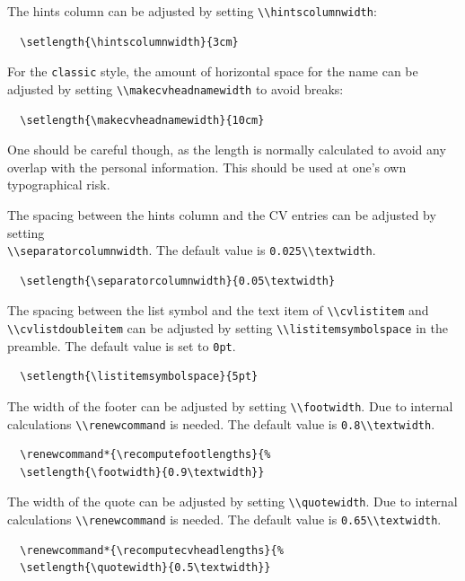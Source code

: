\documentclass[a4paper, 11pt]{article}
\newcommand{\code}[1]{\lstinline!#1!}
\begin{document}
The hints column can be adjusted by setting \code{\\hintscolumnwidth}:
\begin{lstlisting}
  \setlength{\hintscolumnwidth}{3cm}
\end{lstlisting}

For the \code{classic} style, the amount of horizontal space for the name can be adjusted by setting \code{\\makecvheadnamewidth} to avoid breaks:
\begin{lstlisting}
  \setlength{\makecvheadnamewidth}{10cm}
\end{lstlisting}
One should be careful though, as the length is normally calculated to avoid any overlap with the personal information.
This should be used at one's own typographical risk.

The spacing between the hints column and the CV entries can be adjusted by setting\\
\code{\\separatorcolumnwidth}. The default value is \code{0.025\\textwidth}.
\begin{lstlisting}
  \setlength{\separatorcolumnwidth}{0.05\textwidth}
\end{lstlisting}

The spacing between the list symbol and the text item of \code{\\cvlistitem} and \code{\\cvlistdoubleitem} can be adjusted by setting \code{\\listitemsymbolspace} in the preamble. The default value is set to \code{0pt}.
\begin{lstlisting}
  \setlength{\listitemsymbolspace}{5pt}
\end{lstlisting}

The width of the footer can be adjusted by setting \code{\\footwidth}. Due to internal calculations \code{\\renewcommand} is needed. The default value is \code{0.8\\textwidth}.
\begin{lstlisting}
  \renewcommand*{\recomputefootlengths}{%
  \setlength{\footwidth}{0.9\textwidth}}
\end{lstlisting}

The width of the quote can be adjusted by setting \code{\\quotewidth}. Due to internal calculations \code{\\renewcommand} is needed. The default value is \code{0.65\\textwidth}.
\begin{lstlisting}
  \renewcommand*{\recomputecvheadlengths}{%
  \setlength{\quotewidth}{0.5\textwidth}}
\end{lstlisting}
\end{document}
